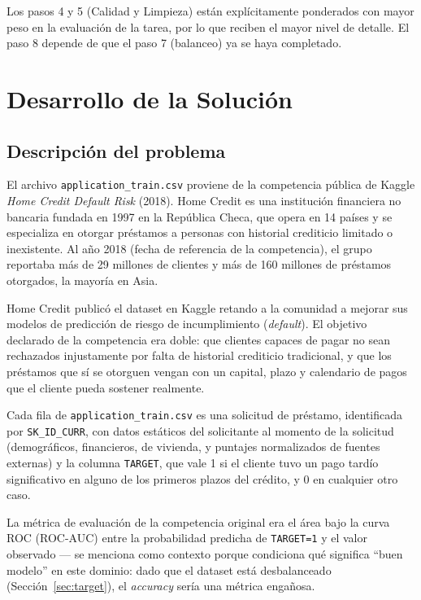 \documentclass[conference]{IEEEtran}
\begin{document}
Los pasos 4 y 5 (Calidad y Limpieza) están explícitamente ponderados con
mayor peso en la evaluación de la tarea, por lo que reciben el mayor nivel
de detalle. El paso 8 depende de que el paso 7 (balanceo) ya se haya
completado.

\section{Desarrollo de la Solución}

\subsection{Descripción del problema}

El archivo \texttt{application\_train.csv} proviene de la competencia
pública de Kaggle \emph{Home Credit Default Risk} (2018). Home Credit es
una institución financiera no bancaria fundada en 1997 en la República
Checa, que opera en 14 países y se especializa en otorgar préstamos a
personas con historial crediticio limitado o inexistente. Al año 2018
(fecha de referencia de la competencia), el grupo reportaba más de 29
millones de clientes y más de 160 millones de préstamos otorgados, la
mayoría en Asia.

Home Credit publicó el dataset en Kaggle retando a la comunidad a mejorar
sus modelos de predicción de riesgo de incumplimiento (\emph{default}).
El objetivo declarado de la competencia era doble: que clientes capaces
de pagar no sean rechazados injustamente por falta de historial
crediticio tradicional, y que los préstamos que sí se otorguen vengan con
un capital, plazo y calendario de pagos que el cliente pueda sostener
realmente.

Cada fila de \texttt{application\_train.csv} es una solicitud de préstamo,
identificada por \texttt{SK\_ID\_CURR}, con datos estáticos del
solicitante al momento de la solicitud (demográficos, financieros, de
vivienda, y puntajes normalizados de fuentes externas) y la columna
\texttt{TARGET}, que vale 1 si el cliente tuvo un pago tardío
significativo en alguno de los primeros plazos del crédito, y 0 en
cualquier otro caso.

La métrica de evaluación de la competencia original era el área bajo la
curva ROC (ROC-AUC) entre la probabilidad predicha de \texttt{TARGET=1} y
el valor observado --- se menciona como contexto porque condiciona qué
significa ``buen modelo'' en este dominio: dado que el dataset está
desbalanceado (Sección~\ref{sec:target}), el \emph{accuracy} sería una
métrica engañosa.
\end{document}
